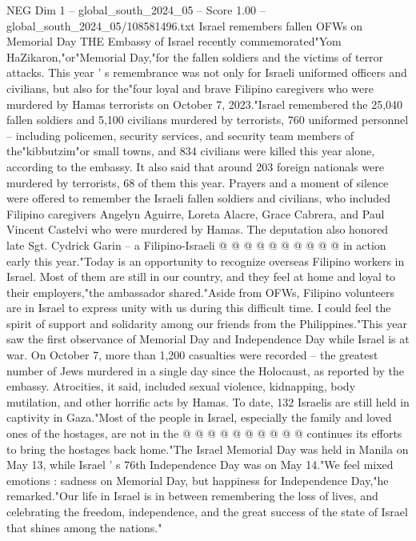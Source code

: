 \begin{textsample}{NEG Dim 1 – global\_south\_2024\_05 – Score 1.00 – global\_south\_2024\_05/108581496.txt}  \label{ex:f1_neg_213}
Israel remembers fallen OFWs on Memorial Day THE Embassy of Israel recently commemorated"Yom HaZikaron,"or"Memorial Day,"for the fallen soldiers and the victims of terror attacks.
This year ' s remembrance was not only for Israeli uniformed officers and civilians, but also for the"four loyal and brave Filipino caregivers who were murdered by Hamas terrorists on October 7, 2023."Israel remembered the 25,040 fallen soldiers and 5,100 civilians murdered by terrorists, 760 uniformed personnel -- including policemen, security services, and security team members of the"kibbutzim"or small towns, and 834 civilians were killed this year alone, according to the embassy.
It also said that around 203 foreign nationals were murdered by terrorists, 68 of them this year.
Prayers and a moment of silence were offered to remember the Israeli fallen soldiers and civilians, who included Filipino caregivers Angelyn Aguirre, Loreta Alacre, Grace Cabrera, and Paul Vincent Castelvi who were murdered by Hamas.
The deputation also honored late Sgt.
Cydrick Garin -- a Filipino-Israeli @ @ @ @ @ @ @ @ @ @ in action early this year."Today is an opportunity to recognize overseas Filipino workers in Israel.
Most of them are still in our country, and they feel at home and loyal to their employers,"the ambassador shared."Aside from OFWs, Filipino volunteers are in Israel to express unity with us during this difficult time.
I could feel the spirit of support and solidarity among our friends from the Philippines."This year saw the first observance of Memorial Day and Independence Day while Israel is at war.
On October 7, more than 1,200 casualties were recorded -- the greatest number of Jews murdered in a single day since the Holocaust, as reported by the embassy.
Atrocities, it said, included sexual violence, kidnapping, body mutilation, and other horrific acts by Hamas.
To date, 132 Israelis are still held in captivity in Gaza."Most of the people in Israel, especially the family and loved ones of the hostages, are not in the @ @ @ @ @ @ @ @ @ @ continues its efforts to bring the hostages back home."The Israel Memorial Day was held in Manila on May 13, while Israel ' s 76th Independence Day was on May 14."We feel mixed emotions : sadness on Memorial Day, but happiness for Independence Day,"he remarked."Our life in Israel is in between remembering the loss of lives, and celebrating the freedom, independence, and the great success of the state of Israel that shines among the nations."

\end{textsample}
